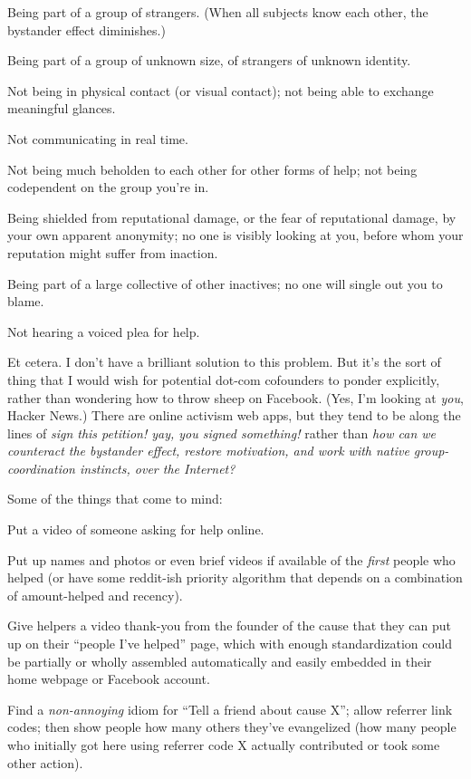 {
 Being part of a group of strangers. (When all subjects know each
other, the bystander effect diminishes.)}

{
 Being part of a group of unknown size, of strangers of unknown
identity.}

{
 Not being in physical contact (or visual contact); not being able
to exchange meaningful glances.}

{
 Not communicating in real time.}

{
 Not being much beholden to each other for other forms of help; not
being codependent on the group you're in.}

{
 Being shielded from reputational damage, or the fear of
reputational damage, by your own apparent anonymity; no one is visibly
looking at you, before whom your reputation might suffer from
inaction.}

{
 Being part of a large collective of other inactives; no one will
single out you to blame.}

{
 Not hearing a voiced plea for help.}

{
 Et cetera. I don't have a brilliant solution to
this problem. But it's the sort of thing that I would
wish for potential dot-com cofounders to ponder explicitly, rather than
wondering how to throw sheep on Facebook. (Yes, I'm
looking at \textit{you}, Hacker News.) There are online activism web
apps, but they tend to be along the lines of \textit{sign this
petition! yay, you signed something!} rather than \textit{how can we
counteract the bystander effect, restore motivation, and work with
native group-coordination instincts, over the Internet?}}

{
 Some of the things that come to mind:}

{
 Put a video of someone asking for help online.}

{
 Put up names and photos or even brief videos if available of the
\textit{first} people who helped (or have some reddit-ish priority
algorithm that depends on a combination of amount-helped and recency).}

{
 Give helpers a video thank-you from the founder of the cause that
they can put up on their ``people I've
helped'' page, which with enough standardization
could be partially or wholly assembled automatically and easily
embedded in their home webpage or Facebook account.}

{
 Find a \textit{non-annoying} idiom for ``Tell a
friend about cause X''; allow referrer link codes;
then show people how many others they've evangelized
(how many people who initially got here using referrer code X actually
contributed or took some other action).}


